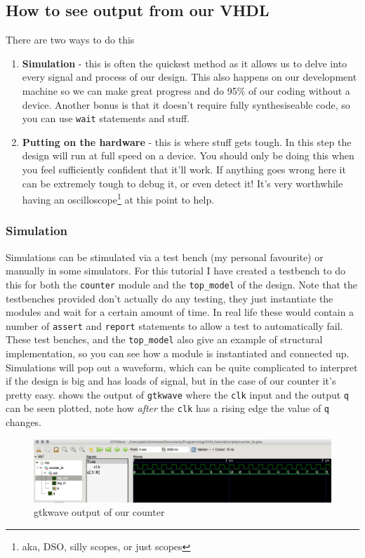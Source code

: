 \subsection{How to see output from our VHDL}
There are two ways to do this
\begin{enumerate}
    \item \textbf{Simulation} - this is often the quickest method as it allows us to delve into every signal and process of our design. This also happens on our development machine so we can make great progress and do 95\% of our coding without a device. Another bonus is that it doesn't require fully synthesiseable code, so you can use \texttt{wait} statements and stuff.
    \item \textbf{Putting on the hardware} - this is where stuff gets tough. In this step the design will run at full speed on a device. You should only be doing this when you feel sufficiently confident that it'll work. If anything goes wrong here it can be extremely tough to debug it, or even detect it! It's very worthwhile having an oscilloscope\footnote{aka, DSO, silly scopes, or just scopes} at this point to help. 
\end{enumerate}

\subsubsection{Simulation}
Simulations can be stimulated via a test bench (my personal favourite) or manually in some simulators. For this tutorial I have created a testbench to do this for both the \texttt{counter} module and the \texttt{top\_model} of the design. Note that the testbenches provided don't actually do any testing, they just instantiate the modules and wait for a certain amount of time. In real life these would contain a number of \texttt{assert} and \texttt{report} statements to allow a test to automatically fail. These test benches, and the \texttt{top\_model} also give an example of structural implementation, so you can see how a module is instantiated and connected up. Simulations will pop out a waveform,  which can be quite complicated to interpret if the design is big and has loads of signal, but in the case of our counter it's pretty easy.  shows the output of \texttt{gtkwave} where the \texttt{clk} input and the output \texttt{q} can be seen plotted, note how \emph{after} the \texttt{clk} has a rising edge the value of \texttt{q} changes.

\begin{figure}[H]
    \begin{center}
        \includegraphics[width=\textwidth]{./src/counter_waveform.png}
    \end{center}
    \caption{gtkwave output of our counter}
    \label{fig:counter_wave}
\end{figure}

